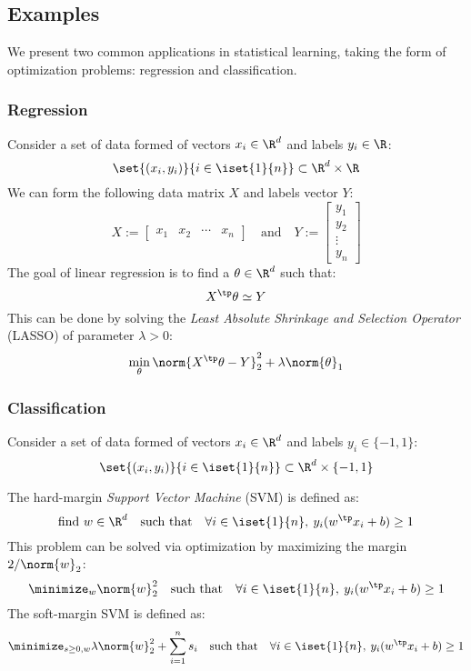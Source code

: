 \subsection{Examples}
We present two common applications in statistical learning, taking the form of optimization problems: regression and classification.
\subsubsection{Regression}
Consider a set of data formed of vectors $x_i\in\R^d$ and labels $y_i\in\R$:
\begin{equation*}
    \set{(x_i, y_i)}{i\in\iset{1}{n}} \subset \R^d\times\R
\end{equation*}
We can form the following data matrix $X$ and labels vector $Y$:
\begin{equation*}
    X:=\begin{bmatrix}x_1 & x_2 & \cdots & x_n\end{bmatrix}
    \quad\text{and}\quad
    Y:=\begin{bmatrix}y_1 \\ y_2 \\ \vdots \\ y_n\end{bmatrix}
\end{equation*}
The goal of linear regression is to find a $\theta\in\R^d$ such that:
\begin{equation*}
    X^\tp\theta \simeq Y
\end{equation*}
This can be done by solving the \emph{Least Absolute Shrinkage and Selection Operator} (LASSO) of parameter $\lambda>0$:
\begin{equation*}
    \min_\theta \norm{X^\tp\theta-Y}_2^2 + \lambda\norm{\theta}_1
\end{equation*}

\subsubsection{Classification}
Consider a set of data formed of vectors $x_i\in\R^d$ and labels $y_i\in\{-1, 1\}$:
\begin{equation*}
    \set{(x_i, y_i)}{i\in\iset{1}{n}} \subset \R^d\times\{-1, 1\}
\end{equation*}

The hard-margin \emph{Support Vector Machine} (SVM) is defined as:
\begin{equation*}
    \text{find } w\in\R^d \quad\text{such that}\quad \forall i\in\iset{1}{n}, \: y_i(w^\tp x_i+b)\geq 1
\end{equation*}
This problem can be solved via optimization by maximizing the margin $2/\norm{w}_2$:
\begin{equation*}
    \minimize_w \norm{w}_2^2 \quad\text{such that}\quad \forall i\in\iset{1}{n}, \: y_i(w^\tp x_i+b)\geq 1
\end{equation*}
The soft-margin SVM is defined as:
\begin{equation*}
    \minimize_{s\geq0, w} \lambda\norm{w}_2^2 + \sum_{i=1}^n s_i \quad\text{such that}\quad \forall i\in\iset{1}{n}, \: y_i(w^\tp x_i+b)\geq 1
\end{equation*}